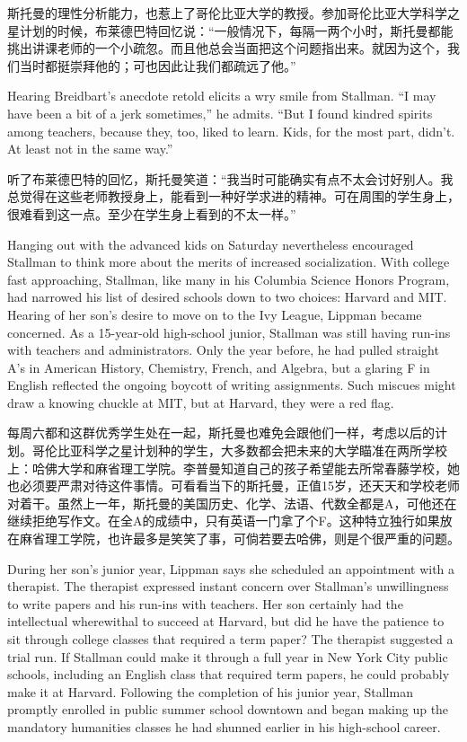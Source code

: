 \ifdefined\chs
斯托曼的理性分析能力，也惹上了哥伦比亚大学的教授。参加哥伦比亚大学科学之星计划的时候，布莱德巴特回忆说：``一般情况下，每隔一两个小时，斯托曼都能挑出讲课老师的一个小疏忽。而且他总会当面把这个问题指出来。就因为这个，我们当时都挺崇拜他的；可也因此让我们都疏远了他。''
\fi

\ifdefined\eng
Hearing Breidbart's anecdote retold elicits a wry smile from Stallman. ``I may have been a bit of a jerk sometimes,'' he admits. ``But I found kindred spirits among teachers, because they, too, liked to learn. Kids, for the most part, didn't. At least not in the same way.''
\fi

\ifdefined\chs
听了布莱德巴特的回忆，斯托曼笑道：``我当时可能确实有点不太会讨好别人。我总觉得在这些老师教授身上，能看到一种好学求进的精神。可在周围的学生身上，很难看到这一点。至少在学生身上看到的不太一样。''
\fi

\ifdefined\eng
Hanging out with the advanced kids on Saturday nevertheless encouraged Stallman to think more about the merits of increased socialization. With college fast approaching, Stallman, like many in his Columbia Science Honors Program, had narrowed his list of desired schools down to two choices: Harvard and MIT. Hearing of her son's desire to move on to the Ivy League, Lippman became concerned. As a 15-year-old high-school junior, Stallman was still having run-ins with teachers and administrators. Only the year before, he had pulled straight A's in American History, Chemistry, French, and Algebra, but a glaring F in English reflected the ongoing boycott of writing assignments. Such miscues might draw a knowing chuckle at MIT, but at Harvard, they were a red flag.
\fi

\ifdefined\chs
每周六都和这群优秀学生处在一起，斯托曼也难免会跟他们一样，考虑以后的计划。哥伦比亚科学之星计划种的学生，大多数都会把未来的大学瞄准在两所学校上：哈佛大学和麻省理工学院。李普曼知道自己的孩子希望能去所常春藤学校，她也必须要严肃对待这件事情。可看看当下的斯托曼，正值15岁，还天天和学校老师对着干。虽然上一年，斯托曼的美国历史、化学、法语、代数全都是A，可他还在继续拒绝写作文。在全A的成绩中，只有英语一门拿了个F。这种特立独行如果放在麻省理工学院，也许最多是笑笑了事，可倘若要去哈佛，则是个很严重的问题。
\fi

\ifdefined\eng
During her son's junior year, Lippman says she scheduled an appointment with a therapist. The therapist expressed instant concern over Stallman's unwillingness to write papers and his run-ins with teachers. Her son certainly had the intellectual wherewithal to succeed at Harvard, but did he have the patience to sit through college classes that required a term paper? The therapist suggested a trial run. If Stallman could make it through a full year in New York City public schools, including an English class that required term papers, he could probably make it at Harvard. Following the completion of his junior year, Stallman promptly enrolled in public summer school downtown and began making up the mandatory humanities classes he had shunned earlier in his high-school career.
\fi

